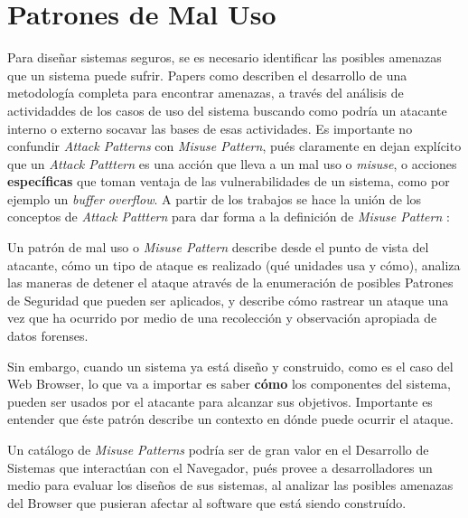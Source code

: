 \section{Patrones de Mal Uso}
Para diseñar sistemas seguros, se es necesario identificar las posibles amenazas que un sistema puede sufrir. Papers como \cite{fernandez2006defining, fernandez2007attack, braz2008eliciting, fernandez2013security} describen el desarrollo de una metodología completa para encontrar amenazas, a través del análisis de actividaddes de los casos de uso del sistema buscando como podría un atacante interno o externo socavar las bases de esas actividades. Es importante no confundir \textit{Attack Patterns} con \textit{Misuse Pattern}, pués claramente en \cite{ModMisusePatt, fernandez2013security} dejan explícito que un \textit{Attack Patttern} es una acción que lleva a un mal uso o \textit{misuse}, o acciones \textbf{específicas} que toman ventaja de las vulnerabilidades de un sistema, como por ejemplo un \textit{buffer overflow}. A partir de los trabajos \cite{fernandez2007attack, yoshioka2006development, yoshioka2007integration}  se hace la unión de los conceptos de \textit{Attack Patttern} para dar forma a la definición de \textit{Misuse Pattern} \cite{ModMisusePatt, pelaez2009misuse, fernandez2010worm, hashizume2011misuse, munoz2011misuse, fernandez2012misuse, alkazimi2014, encinamisuse}:
\begin{center}
    Un patrón de mal uso o \textit{Misuse Pattern} describe desde el punto de vista del atacante, cómo un tipo de ataque es realizado (qué unidades usa y cómo), analiza las maneras de detener el ataque através de la enumeración de posibles Patrones de Seguridad que pueden ser aplicados, y describe cómo rastrear un ataque una vez que ha ocurrido por medio de una recolección y observación apropiada de datos forenses.
\end{center}

Sin embargo, cuando un sistema ya está diseño y construido, como es el caso del Web Browser, lo que va a importar es saber \textbf{cómo} los componentes del sistema, pueden ser usados por el atacante para alcanzar sus objetivos. Importante es entender que éste patrón describe un contexto en dónde puede ocurrir el ataque.

Un catálogo de \textit{Misuse Patterns} podría ser de gran valor en el Desarrollo de Sistemas que interactúan con el Navegador, pués provee a desarrolladores un medio para evaluar los diseños de sus sistemas, al analizar las posibles amenazas del Browser que pusieran afectar al software que está siendo construído.
